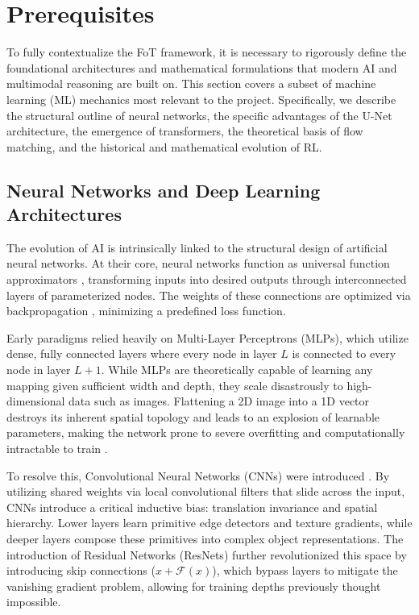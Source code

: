 \documentclass{l4proj}
\begin{document}
\section{Prerequisites}
To fully contextualize the FoT framework, it is necessary to rigorously define the foundational architectures and mathematical formulations that modern AI and multimodal reasoning are built on. This section covers a subset of machine learning (ML) mechanics most relevant to the project. Specifically, we describe the structural outline of neural networks, the specific advantages of the U-Net architecture, the emergence of transformers, the theoretical basis of flow matching, and the historical and mathematical evolution of RL.

\subsection{Neural Networks and Deep Learning Architectures}
The evolution of AI is intrinsically linked to the structural design of artificial neural networks. At their core, neural networks function as universal function approximators \citep{hornik1989multilayer}, transforming inputs into desired outputs through interconnected layers of parameterized nodes. The weights of these connections are optimized via backpropagation \citep{rumelhart1986learning}, minimizing a predefined loss function.

Early paradigms relied heavily on Multi-Layer Perceptrons (MLPs), which utilize dense, fully connected layers where every node in layer $L$ is connected to every node in layer $L+1$. While MLPs are theoretically capable of learning any mapping given sufficient width and depth, they scale disastrously to high-dimensional data such as images. Flattening a 2D image into a 1D vector destroys its inherent spatial topology and leads to an explosion of learnable parameters, making the network prone to severe overfitting and computationally intractable to train \citep{lecun2015deep}.

To resolve this, Convolutional Neural Networks (CNNs) were introduced \citep{lecun1989backpropagation, krizhevsky2012imagenet}. By utilizing shared weights via local convolutional filters that slide across the input, CNNs introduce a critical inductive bias: translation invariance and spatial hierarchy. Lower layers learn primitive edge detectors and texture gradients, while deeper layers compose these primitives into complex object representations. The introduction of Residual Networks (ResNets) \citep{he2016deep} further revolutionized this space by introducing skip connections ($x + \mathcal{F}(x)$), which bypass layers to mitigate the vanishing gradient problem, allowing for training depths previously thought impossible.
\end{document}
